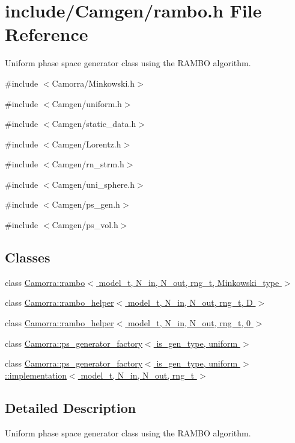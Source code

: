 \hypertarget{a00621}{
\section{include/Camgen/rambo.h File Reference}
\label{a00621}
}


Uniform phase space generator class using the RAMBO algorithm.  


{\ttfamily \#include $<$Camorra/Minkowski.h$>$}\par
{\ttfamily \#include $<$Camgen/uniform.h$>$}\par
{\ttfamily \#include $<$Camgen/static\_\-data.h$>$}\par
{\ttfamily \#include $<$Camgen/Lorentz.h$>$}\par
{\ttfamily \#include $<$Camgen/rn\_\-strm.h$>$}\par
{\ttfamily \#include $<$Camgen/uni\_\-sphere.h$>$}\par
{\ttfamily \#include $<$Camgen/ps\_\-gen.h$>$}\par
{\ttfamily \#include $<$Camgen/ps\_\-vol.h$>$}\par
\subsection*{Classes}
\begin{DoxyCompactItemize}
\item 
class \hyperlink{a00454}{Camorra::rambo$<$ model\_\-t, N\_\-in, N\_\-out, rng\_\-t, Minkowski\_\-type $>$}
\item 
class \hyperlink{a00455}{Camorra::rambo\_\-helper$<$ model\_\-t, N\_\-in, N\_\-out, rng\_\-t, D $>$}
\item 
class \hyperlink{a00456}{Camorra::rambo\_\-helper$<$ model\_\-t, N\_\-in, N\_\-out, rng\_\-t, 0 $>$}
\item 
class \hyperlink{a00436}{Camorra::ps\_\-generator\_\-factory$<$ is\_\-gen\_\-type, uniform $>$}
\item 
class \hyperlink{a00267}{Camorra::ps\_\-generator\_\-factory$<$ is\_\-gen\_\-type, uniform $>$::implementation$<$ model\_\-t, N\_\-in, N\_\-out, rng\_\-t $>$}
\end{DoxyCompactItemize}


\subsection{Detailed Description}
Uniform phase space generator class using the RAMBO algorithm. 